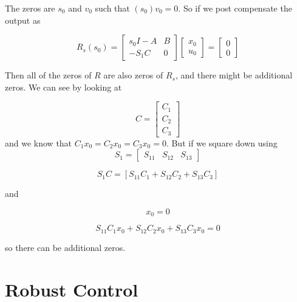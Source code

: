 The zeros are $s_{0}$ and $v_{0}$ such that $(s_{0})v_{0}=0$.
So if we post compensate the output as

\begin{equation*}
  R_{s}(s_{0})=
  \begin{bmatrix}
    s_{0}I-A & B \\
    -S_{1}C & 0
  \end{bmatrix}
  \begin{bmatrix}
    x_{0} \\
    u_{0}
  \end{bmatrix}
  =
  \begin{bmatrix}
    0 \\
    0
  \end{bmatrix}
\end{equation*}

Then all of the zeros of $R$ are also zeros of $R_{s}$, and there might be additional zeros.
We can see by looking at

\begin{equation*}
  C=
  \begin{bmatrix}
    C_{1} \\
    C_{2} \\
    C_{3}
  \end{bmatrix}
\end{equation*}
and we know that $C_{1}x_{0}=C_{2}x_{0}=C_{3}x_{0}=0$.
But if we square down using
\begin{equation*}
  S_{1}=
  \begin{bmatrix}
    S_{11} & S_{12} & S_{13}
  \end{bmatrix}
\end{equation*}

\begin{equation*}
  S_{1}C=[S_{11}C_{1}+S_{12}C_{2}+S_{13}C_{3}]
\end{equation*}

and

\begin{equation*}
  [S_{11}C_{1}+S_{12}C_{2}+S_{13}C_{3}]x_{0}=0
\end{equation*}

\begin{equation*}
  S_{11}C_{1}x_{0}+S_{12}C_{2}x_{0}+S_{13}C_{3}x_{0}=0
\end{equation*}

so there can be additional zeros.

\chapter{Robust Control}

